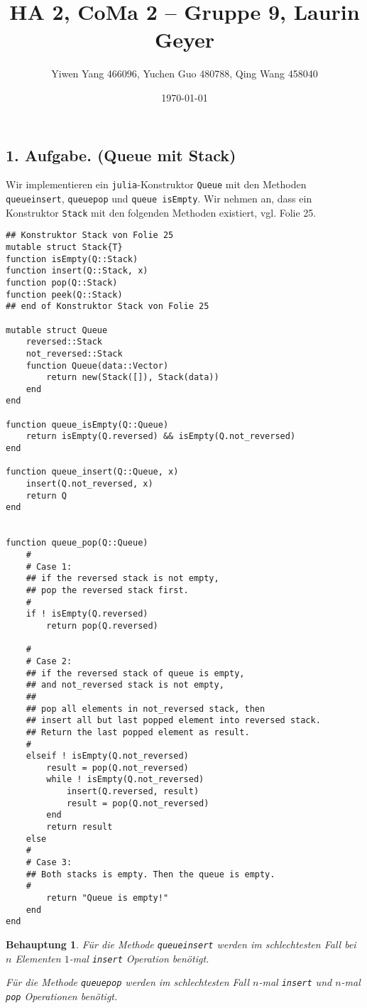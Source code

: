 \documentclass[draft,a5paper]{article}
\author{Yiwen Yang 466096, Yuchen Guo 480788, Qing Wang 458040}
\date{\today}
\title{HA 2, CoMa 2 -- Gruppe 9, Laurin Geyer}
\newtheorem*{beh}{Behauptung}
\begin{document}
\maketitle

\newpage

\subsection*{1. Aufgabe. (Queue mit Stack)}
Wir implementieren ein \texttt{julia}-Konstruktor \texttt{Queue} mit
den Methoden \texttt{queue\textunderscore insert},
\texttt{queue\textunderscore pop} und \texttt{queue\textunderscore
  isEmpty}.  Wir nehmen an, dass ein Konstruktor \texttt{Stack} mit den
folgenden Methoden existiert, vgl. Folie 25.

\begin{verbatim}
## Konstruktor Stack von Folie 25
mutable struct Stack{T}
function isEmpty(Q::Stack)
function insert(Q::Stack, x)
function pop(Q::Stack)
function peek(Q::Stack)
## end of Konstruktor Stack von Folie 25

mutable struct Queue
    reversed::Stack
    not_reversed::Stack
    function Queue(data::Vector)
        return new(Stack([]), Stack(data))
    end
end

function queue_isEmpty(Q::Queue)
    return isEmpty(Q.reversed) && isEmpty(Q.not_reversed)
end

function queue_insert(Q::Queue, x)
    insert(Q.not_reversed, x)
    return Q
end


function queue_pop(Q::Queue)
    #
    # Case 1:
    ## if the reversed stack is not empty,
    ## pop the reversed stack first.
    #
    if ! isEmpty(Q.reversed)
        return pop(Q.reversed)

    #
    # Case 2:
    ## if the reversed stack of queue is empty,
    ## and not_reversed stack is not empty,
    ##
    ## pop all elements in not_reversed stack, then
    ## insert all but last popped element into reversed stack.
    ## Return the last popped element as result.
    #
    elseif ! isEmpty(Q.not_reversed)
        result = pop(Q.not_reversed)
        while ! isEmpty(Q.not_reversed)
            insert(Q.reversed, result)
            result = pop(Q.not_reversed)
        end
        return result
    else
    #
    # Case 3:
    ## Both stacks is empty. Then the queue is empty.
    #
        return "Queue is empty!"
    end
end
\end{verbatim}
\begin{beh}
  Für die Methode \texttt{queue\textunderscore insert} werden im
  schlechtesten Fall bei \(n\) Elementen \(1\)-mal \texttt{insert}
  Operation benötigt.

  Für die Methode \texttt{queue\textunderscore pop} werden im
  schlechtesten Fall \(n\)-mal \texttt{insert} und \(n\)-mal
  \texttt{pop} Operationen benötigt.
\end{beh}
\end{document}

